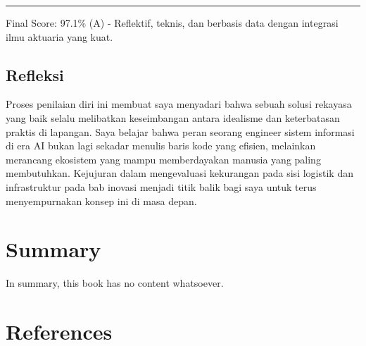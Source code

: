 \documentclass[
  letterpaper,
  DIV=11,
  numbers=noendperiod]{scrreprt}
\begin{document}
\begin{center}\rule{0.5\linewidth}{0.5pt}\end{center}

Final Score: 97.1\% (A) - Reflektif, teknis, dan berbasis data dengan
integrasi ilmu aktuaria yang kuat.

\section{Refleksi}\label{refleksi-2}

Proses penilaian diri ini membuat saya menyadari bahwa sebuah solusi
rekayasa yang baik selalu melibatkan keseimbangan antara idealisme dan
keterbatasan praktis di lapangan. Saya belajar bahwa peran seorang
engineer sistem informasi di era AI bukan lagi sekadar menulis baris
kode yang efisien, melainkan merancang ekosistem yang mampu
memberdayakan manusia yang paling membutuhkan. Kejujuran dalam
mengevaluasi kekurangan pada sisi logistik dan infrastruktur pada bab
inovasi menjadi titik balik bagi saya untuk terus menyempurnakan konsep
ini di masa depan.


\chapter{Summary}\label{summary}

In summary, this book has no content whatsoever.


\chapter*{References}\label{references}


\label{refs}
\end{document}
